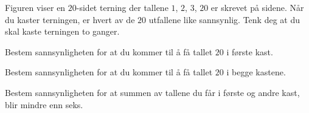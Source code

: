 Figuren viser en $20$-sidet terning der tallene $1$, $2$, $3$, $20$ er skrevet
på sidene. Når du kaster terningen, er hvert av de $20$ utfallene like
sannsynlig.  Tenk deg at du skal kaste terningen to ganger.

\begin{oppgaver}
   Bestem sannsynligheten for at du kommer til å få tallet $20$ i første
  kast.
\end{oppgaver}

\begin{oppgaver}
   Bestem sannsynligheten for at du kommer til å få tallet $20$ i begge
  kastene.
\end{oppgaver}

\begin{oppgaver}
   Bestem sannsynligheten for at summen av tallene du får i første og
  andre kast, blir mindre enn seks.
\end{oppgaver}



\Oppgave[4]

\begin{figure}[H]
  \centering
  \caption{}
  \label{fig:Forkurs-1p-2p-laererutdanning-2017-V-U-oppgave-2-3}
\end{figure}


